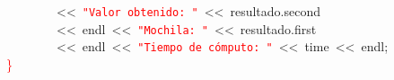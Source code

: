 \mbox{}\ \ \ \ \ \ \ \ \textcolor{BrickRed}{\textless{}\textless{}}\ \texttt{\textcolor{Red}{"{}Valor\ obtenido:\ "{}}}\ \textcolor{BrickRed}{\textless{}\textless{}}\ resultado\textcolor{BrickRed}{.}second \\
\mbox{}\ \ \ \ \ \ \ \ \textcolor{BrickRed}{\textless{}\textless{}}\ endl\ \textcolor{BrickRed}{\textless{}\textless{}}\ \texttt{\textcolor{Red}{"{}Mochila:\ "{}}}\ \textcolor{BrickRed}{\textless{}\textless{}}\ resultado\textcolor{BrickRed}{.}first \\
\mbox{}\ \ \ \ \ \ \ \ \textcolor{BrickRed}{\textless{}\textless{}}\ endl\ \textcolor{BrickRed}{\textless{}\textless{}}\ \texttt{\textcolor{Red}{"{}Tiempo\ de\ cómputo:\ "{}}}\ \textcolor{BrickRed}{\textless{}\textless{}}\ time\ \textcolor{BrickRed}{\textless{}\textless{}}\ endl\textcolor{BrickRed}{;} \\
\mbox{}\textcolor{Red}{\}} \\
\mbox{}
